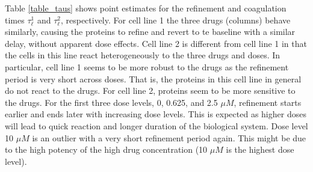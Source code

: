 Table \ref{table_taus} shows point estimates for the refinement and
coagulation times $\tau^1_{\ell }$ and $\tau^2_{\ell }$,
respectively.
For cell line 1 the three drugs (columns) behave similarly,
causing the proteins to refine and revert to te baseline with a similar delay,
without apparent dose effects. Cell line 2 is different from cell line
1 in that the cells in this line react heterogeneously to the three drugs and
doses. In particular, cell line 1 seems to be more robust to the drugs as the
refinement period is very short across doses. That is, the proteins in
this cell line in general do not react to the drugs. For cell line 2,
proteins seem to be more sensitive to the drugs.  For the first three dose
levels, 0, 0.625, and 2.5 $\mu M$, refinement starts earlier and ends
later with increasing dose levels. This is expected as higher doses
will lead to quick reaction and longer duration of the biological
system. Dose level 10 $\mu M$ is an outlier with a very short
refinement period again. This might be due to the high 
potency of the high drug concentration (10 $\mu M$ is the highest dose level).

